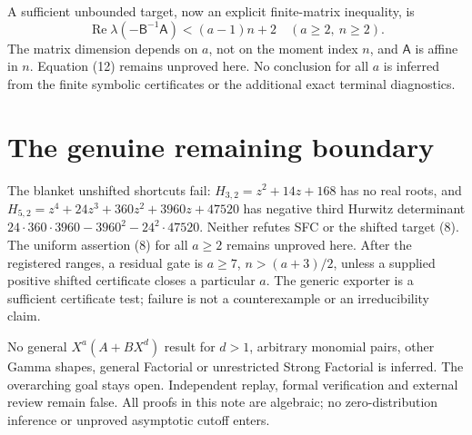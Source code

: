 \documentclass[11pt]{article}
\begin{document}
A sufficient unbounded target, now an explicit finite-matrix inequality, is
\[
 \operatorname{Re}\lambda(-\mathsf B^{-1}\mathsf A)<(a-1)n+2
                  \quad(a\ge2,\ n\ge2).              \tag{12}
\]
The matrix dimension depends on $a$, not on the moment index $n$, and
$\mathsf A$ is affine in $n$. Equation (12) remains unproved here.
No conclusion for all $a$ is inferred from the finite symbolic certificates
or the additional exact terminal diagnostics.

\section{The genuine remaining boundary}
The blanket unshifted shortcuts fail:
$H_{3,2}=z^2+14z+168$ has no real roots, and
$H_{5,2}=z^4+24z^3+360z^2+3960z+47520$ has negative third Hurwitz
determinant $24\cdot360\cdot3960-3960^2-24^2\cdot47520$.
Neither refutes SFC or the shifted target (8).
The uniform assertion (8) for all $a\ge2$ remains unproved here.
After the registered ranges, a residual gate is $a\ge7$,
$n>(a+3)/2$, unless a supplied positive shifted certificate closes a
particular $a$. The generic exporter is a sufficient certificate test;
failure is not a counterexample or an irreducibility claim.

No general $X^a(A+BX^d)$ result for $d>1$, arbitrary monomial pairs,
other Gamma shapes, general Factorial or unrestricted Strong Factorial
is inferred. The overarching goal stays open. Independent replay,
formal verification and external review remain false. All proofs in
this note are algebraic; no zero-distribution inference or unproved
asymptotic cutoff enters.
\end{document}
